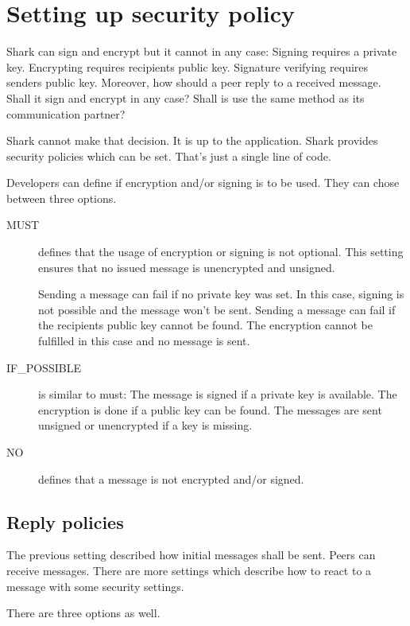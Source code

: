 \section{Setting up security policy}
Shark can sign and encrypt but it cannot in any case: Signing requires a private key. Encrypting requires recipients public key. Signature verifying requires senders public key. Moreover, how should a peer reply to a received message. Shall it sign and encrypt in any case? Shall is use the same method as its communication partner? 

Shark cannot make that decision. It is up to the application. Shark provides security policies which can be set. That's just a single line of code.

Developers can define if encryption and/or signing is to be used. They can chose between three options.
\begin{description}
    \item[MUST] defines that the usage of encryption or signing is not optional. This setting ensures that no issued message is unencrypted and unsigned. 

Sending a message can fail if no private key was set. In this case, signing is not possible and the message won't be sent. Sending a message can fail if the recipients public key cannot be found. The encryption cannot be fulfilled in this case and no message is sent.

    \item[IF\_POSSIBLE] is similar to must: The message is signed if a private key is available. The encryption is done if a public key can be found. The messages are sent unsigned or unencrypted if a key is missing.

    \item[NO] defines that a message is not encrypted and/or signed.
\end{description}

\subsection{Reply policies}
The previous setting described how initial messages shall be sent. Peers can receive messages. There are more settings which describe how to react to a message with some security settings.

There are three options as well.

